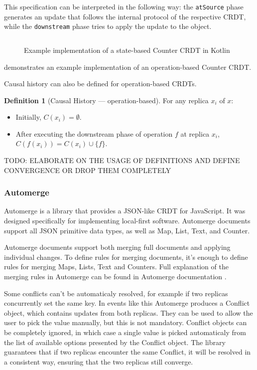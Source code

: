 \documentclass[a4paper, 11pt, oneside]{article}
\theoremstyle{definition}
\newtheorem{definition}{Definition}[section]
\begin{document}
This specification can be interpreted in the following way: the \verb|atSource| phase generates an update that follows the internal protocol of the respective CRDT, while the \verb|downstream| phase tries to apply the update to the object.

\begin{figure}
    \inputminted[frame=single,linenos]{kotlin}{lst/operation-counter.kt}
    \caption{Example implementation of a state-based Counter CRDT in Kotlin}
    \label{fig:operation-counter}
\end{figure}

 demonstrates an example implementation of an operation-based Counter CRDT.

Causal history can also be defined for operation-based CRDTs.

\begin{definition}[Causal History — operation-based]
    For any replica $x_i$ of $x$:
\begin{itemize}
    \item Initially, $C(x_i) = \emptyset$.
    \item After executing the downstream phase of operation $f$ at replica $x_i$, $C(f(x_i)) = C(x_i) \cup \{f\}$.
\end{itemize}
\end{definition}

TODO: ELABORATE ON THE USAGE OF DEFINITIONS AND DEFINE CONVERGENCE OR DROP THEM COMPLETELY 

\subsubsection{Automerge}
Automerge \cite{automerge} is a library that provides a JSON-like CRDT for JavaScript. It was designed specifically for implementing local-first software. Automerge documents support all JSON primitive data types, as well as Map, List, Text, and Counter. 

Automerge documents support both merging full documents and applying individual changes. To define rules for merging documents, it's enough to define rules for merging Maps, Lists, Text and Counters. Full explanation of the merging rules in Automerge can be found in Automerge documentation \cite{automergerules}.

Some conflicts can't be automaticaly resolved, for example if two replicas concurrently set the same key. In events like this Automerge produces a Conflict object, which contains updates from both replicas. They can be used to allow the user to pick the value manually, but this is not mandatory. Conflict objects can be completely ignored, in which case a single value is picked automaticaly from the list of available options presented by the Conflict object. The library guarantees that if two replicas encounter the same Conflict, it will be resolved in a consistent way, ensuring that the two replicas still converge.
\end{document}
